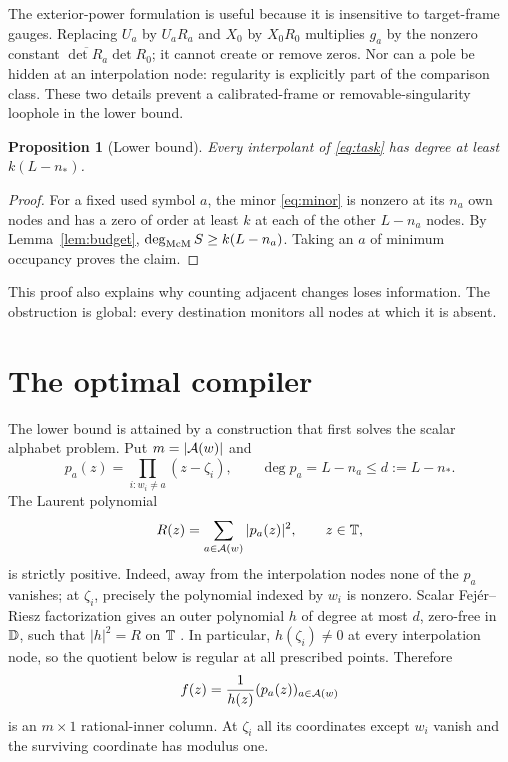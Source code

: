 \documentclass[11pt]{article}
\newtheorem{proposition}[theorem]{Proposition}
\theoremstyle{definition}\newtheorem{definition}[theorem]{Definition}\newtheorem{example}[theorem]{Example}
\theoremstyle{remark}\newtheorem{remark}[theorem]{Remark}\newtheorem{limitation}[theorem]{Limitation}
\begin{document}
The exterior-power formulation is useful because it is insensitive to
target-frame gauges.  Replacing $U_a$ by $U_aR_a$ and $X_0$ by $X_0R_0$
multiplies $g_a$ by the nonzero constant
$\overline{\det R_a}\det R_0$; it cannot create or remove zeros.  Nor can a
pole be hidden at an interpolation node: regularity is explicitly part of
the comparison class.  These two details prevent a calibrated-frame or
removable-singularity loophole in the lower bound.

\begin{proposition}[Lower bound]\label{prop:lower}
Every interpolant of \eqref{eq:task} has degree at least $k(L-n_*)$.
\end{proposition}
\begin{proof}
For a fixed used symbol $a$, the minor \eqref{eq:minor} is nonzero at its
$n_a$ own nodes and has a zero of order at least $k$ at each of the other
$L-n_a$ nodes.  By Lemma~\ref{lem:budget},
$\deg_{\mathrm{McM}} S\ge k(L-n_a)$.  Taking an $a$ of minimum occupancy proves the
claim.
\end{proof}

This proof also explains why counting adjacent changes loses information.
The obstruction is global: every destination monitors all nodes at which it
is absent.

\section{The optimal compiler}

The lower bound is attained by a construction that first solves the scalar
alphabet problem.  Put $m=|\mathcal A(w)|$ and
\begin{equation}\label{eq:pa}
                 p_a(z)=\prod_{i:w_i\ne a}(z-\zeta_i),
                 \qquad \deg p_a=L-n_a\le d:=L-n_*.
\end{equation}
The Laurent polynomial
\begin{equation}\label{eq:R}
                           R(z)=\sum_{a\in\mathcal A(w)}|p_a(z)|^2,
                           \qquad z\in\mathbb T,
\end{equation}
is strictly positive.  Indeed, away from the interpolation nodes none of the
$p_a$ vanishes; at $\zeta_i$, precisely the polynomial indexed by $w_i$ is
nonzero.  Scalar Fej\'er--Riesz factorization gives an outer polynomial $h$
of degree at most $d$, zero-free in $\mathbb D$, such that
$|h|^2=R$ on $\mathbb T$ \cite{DritschelRovnyak2009}.  In particular,
$h(\zeta_i)\ne0$ at every interpolation node, so the quotient below is
regular at all prescribed points.  Therefore
\begin{equation}\label{eq:f}
                       f(z)=\frac{1}{h(z)}(p_a(z))_{a\in\mathcal A(w)}
\end{equation}
is an $m\times1$ rational-inner column.  At $\zeta_i$ all its coordinates
except $w_i$ vanish and the surviving coordinate has modulus one.
\end{document}
